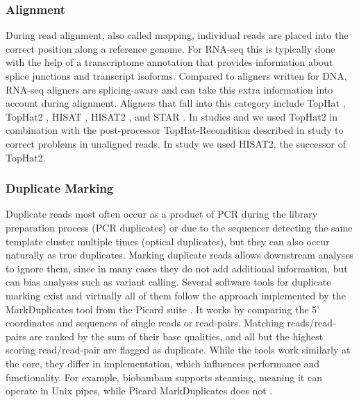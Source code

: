 \documentclass[11pt]{book}
\begin{document}
\subsubsection*{Alignment}

During read alignment, also called mapping, individual reads are placed into the correct position along a reference genome. For RNA-seq this is typically done with the help of a transcriptome annotation that provides information about splice junctions and transcript isoforms. Compared to aligners written for DNA, RNA-seq aligners are splicing-aware and can take this extra information into account during alignment. Aligners that fall into this category include TopHat \cite{Trapnell:2009}, TopHat2 \cite{Kim:2013-tophat2}, HISAT \cite{Kim:2015-hisat}, HISAT2 \cite{Kim:2019-hisat2}, and STAR \cite{Dobin:2013}. In studies \I and \III we used TopHat2 in combination with the post-processor TopHat-Recondition described in study \II to correct problems in unaligned reads. In study \IV we used HISAT2, the successor of TopHat2.


\subsubsection*{Duplicate Marking}

Duplicate reads most often occur as a product of PCR during the library preparation process (PCR duplicates) or due to the sequencer detecting the same template cluster multiple times (optical duplicates), but they can also occur naturally as true duplicates. Marking duplicate reads allows downstream analyses to ignore them, since in many cases they do not add additional information, but can bias analyses such as variant calling. Several software tools for duplicate marking exist \cite{Li:2009-samtools, Burriesci:2012, Tarasov:2015, Tischler:2014, Faust:2014} and virtually all of them follow the approach implemented by the MarkDuplicates tool from the Picard suite \cite{picard}. It works by comparing the 5' coordinates and sequences of single reads or read-pairs. Matching reads/read-pairs are ranked by the sum of their base qualities, and all but the highest scoring read/read-pair are flagged as duplicate. While the tools work similarly at the core, they differ in implementation, which influences performance and functionality. For example, biobambam supports steaming, meaning it can operate in Unix pipes, while Picard MarkDuplicates does not \cite{Tischler:2014}.
\end{document}
